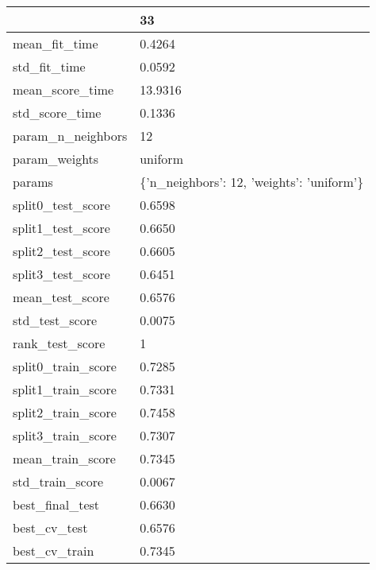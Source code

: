 \begin{tabular}{ll}
\toprule
{} &                                         33 \\
\midrule
mean\_fit\_time      &                                     0.4264 \\
std\_fit\_time       &                                     0.0592 \\
mean\_score\_time    &                                    13.9316 \\
std\_score\_time     &                                     0.1336 \\
param\_n\_neighbors  &                                         12 \\
param\_weights      &                                    uniform \\
params             &  \{'n\_neighbors': 12, 'weights': 'uniform'\} \\
split0\_test\_score  &                                     0.6598 \\
split1\_test\_score  &                                     0.6650 \\
split2\_test\_score  &                                     0.6605 \\
split3\_test\_score  &                                     0.6451 \\
mean\_test\_score    &                                     0.6576 \\
std\_test\_score     &                                     0.0075 \\
rank\_test\_score    &                                          1 \\
split0\_train\_score &                                     0.7285 \\
split1\_train\_score &                                     0.7331 \\
split2\_train\_score &                                     0.7458 \\
split3\_train\_score &                                     0.7307 \\
mean\_train\_score   &                                     0.7345 \\
std\_train\_score    &                                     0.0067 \\
best\_final\_test    &                                     0.6630 \\
best\_cv\_test       &                                     0.6576 \\
best\_cv\_train      &                                     0.7345 \\
\bottomrule
\end{tabular}
